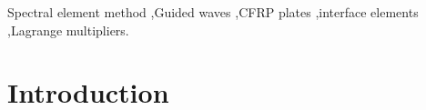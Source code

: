 \documentclass[preprint,12pt]{elsarticle}
\begin{document}
\begin{frontmatter}
\begin{keyword}
Spectral element method \sep Guided waves \sep CFRP plates \sep interface elements \sep Lagrange multipliers.


\end{keyword}

\end{frontmatter}


\section{Introduction}
\end{document}
